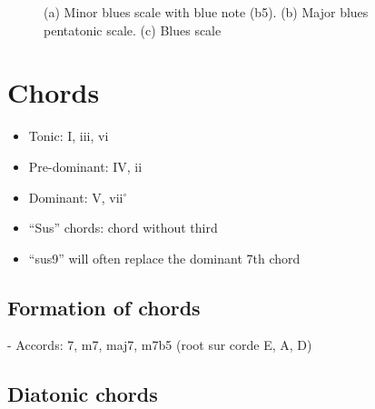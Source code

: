 \documentclass{article}
\begin{document}
\begin{figure}[h!]
	\centering
	\hspace*{-1cm}
	\scalebox{0.7}{}
	\hspace*{-1cm}
	\scalebox{0.7}{}
	\hspace*{-1cm}
	\scalebox{0.7}{}
	\caption{(a) Minor blues scale with blue note (b5). (b) Major blues pentatonic scale. (c) Blues scale  }
	\label{fig:blues_penta_mineur}
\end{figure}

\newpage
\section{Chords}

\begin{itemize}
	\item Tonic: I, iii, vi
	\item Pre-dominant: IV, ii
	\item Dominant: V, vii$^\circ$
\end{itemize}


\begin{itemize}
	\item ``Sus'' chords: chord without third
	\item ``sus9'' will often replace the dominant 7th chord
\end{itemize}

\newpage
\subsection{Formation of chords}



- Accords: 7, m7, maj7, m7b5 (root sur corde E, A, D)


\newpage
\subsection{Diatonic chords}

\end{document}
